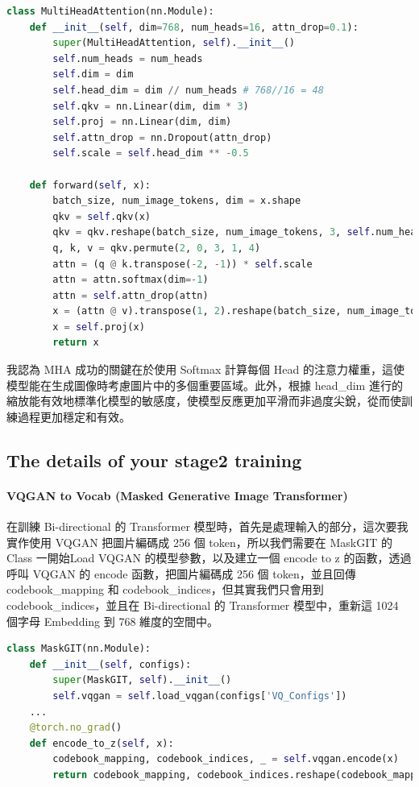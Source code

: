 \begin{lstlisting}[language=Python, caption=Multi-Head Attention 實作]
class MultiHeadAttention(nn.Module):
    def __init__(self, dim=768, num_heads=16, attn_drop=0.1):
        super(MultiHeadAttention, self).__init__()
        self.num_heads = num_heads
        self.dim = dim
        self.head_dim = dim // num_heads # 768//16 = 48
        self.qkv = nn.Linear(dim, dim * 3)
        self.proj = nn.Linear(dim, dim)
        self.attn_drop = nn.Dropout(attn_drop)
        self.scale = self.head_dim ** -0.5

    def forward(self, x):
        batch_size, num_image_tokens, dim = x.shape
        qkv = self.qkv(x)
        qkv = qkv.reshape(batch_size, num_image_tokens, 3, self.num_heads, self.head_dim)
        q, k, v = qkv.permute(2, 0, 3, 1, 4)
        attn = (q @ k.transpose(-2, -1)) * self.scale 
        attn = attn.softmax(dim=-1)
        attn = self.attn_drop(attn)
        x = (attn @ v).transpose(1, 2).reshape(batch_size, num_image_tokens, dim)
        x = self.proj(x)
        return x
\end{lstlisting}


我認為 MHA 成功的關鍵在於使用 Softmax 計算每個 Head 的注意力權重，這使模型能在生成圖像時考慮圖片中的多個重要區域。此外，根據 head\_dim 進行的縮放能有效地標準化模型的敏感度，使模型反應更加平滑而非過度尖銳，從而使訓練過程更加穩定和有效。


\subsection{The details of your stage2 training}

\paragraph{VQGAN to Vocab (Masked Generative Image Transformer)}
在訓練 Bi-directional 的 Transformer 模型時，首先是處理輸入的部分，這次要我實作使用 VQGAN 把圖片編碼成 256 個 token，所以我們需要在 MaskGIT 的 Class 一開始Load VQGAN 的模型參數，以及建立一個 encode to z 的函數，透過呼叫 VQGAN 的 encode 函數，把圖片編碼成 256 個 token，並且回傳 codebook\_mapping 和 codebook\_indices，但其實我們只會用到 codebook\_indices，並且在 Bi-directional 的 Transformer 模型中，重新這 1024 個字母 Embedding 到 768 維度的空間中。

\begin{lstlisting}[language=Python, caption=MaskGIT 訓練實作]
class MaskGIT(nn.Module):
    def __init__(self, configs):
        super(MaskGIT, self).__init__()
        self.vqgan = self.load_vqgan(configs['VQ_Configs'])
    ...
    @torch.no_grad()
    def encode_to_z(self, x):
        codebook_mapping, codebook_indices, _ = self.vqgan.encode(x)
        return codebook_mapping, codebook_indices.reshape(codebook_mapping.shape[0], -1)
\end{lstlisting}


